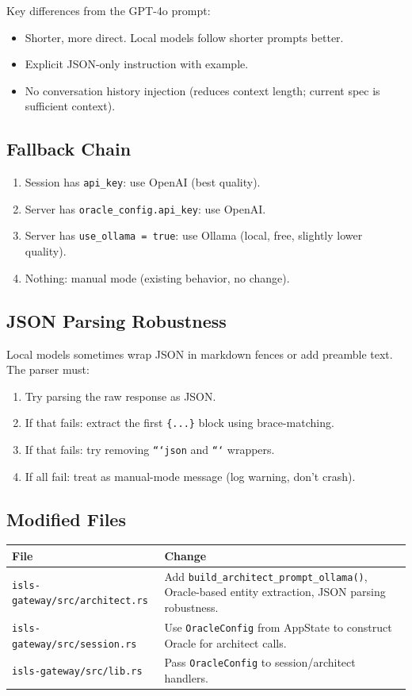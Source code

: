 \documentclass[11pt,a4paper]{article}
\begin{document}
Key differences from the GPT-4o prompt:
\begin{itemize}[nosep]
\item Shorter, more direct. Local models follow shorter prompts 
      better.
\item Explicit JSON-only instruction with example.
\item No conversation history injection (reduces context length; 
      current spec is sufficient context).
\end{itemize}

\subsection{Fallback Chain}

\begin{enumerate}[nosep]
\item Session has \texttt{api\_key}: use OpenAI (best quality).
\item Server has \texttt{oracle\_config.api\_key}: use OpenAI.
\item Server has \texttt{use\_ollama = true}: use Ollama 
      (local, free, slightly lower quality).
\item Nothing: manual mode (existing behavior, no change).
\end{enumerate}

\subsection{JSON Parsing Robustness}

Local models sometimes wrap JSON in markdown fences or add 
preamble text. The parser must:
\begin{enumerate}[nosep]
\item Try parsing the raw response as JSON.
\item If that fails: extract the first \texttt{\{...\}} block 
      using brace-matching.
\item If that fails: try removing \texttt{```json} and 
      \texttt{```} wrappers.
\item If all fail: treat as manual-mode message (log warning, 
      don't crash).
\end{enumerate}

\subsection{Modified Files}

\begin{longtable}{lp{10cm}}
\toprule
\textbf{File} & \textbf{Change} \\
\midrule
\texttt{isls-gateway/src/architect.rs}
  & Add \texttt{build\_architect\_prompt\_ollama()}, 
    Oracle-based entity extraction, JSON parsing 
    robustness. \\
\texttt{isls-gateway/src/session.rs}
  & Use \texttt{OracleConfig} from AppState to construct 
    Oracle for architect calls. \\
\texttt{isls-gateway/src/lib.rs}
  & Pass \texttt{OracleConfig} to session/architect 
    handlers. \\
\bottomrule
\end{longtable}
\end{document}
